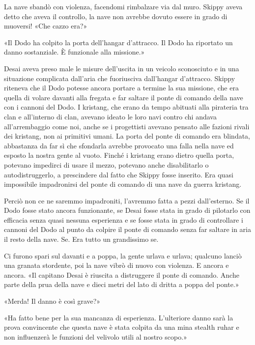 La nave sbandò con violenza, facendomi rimbalzare via dal muro. Skippy
aveva detto che aveva il controllo, la nave non avrebbe dovuto essere in
grado di muoversi! «Che cazzo era?»

«Il Dodo ha colpito la porta dell'hangar d'attracco. Il Dodo ha
riportato un danno sostanziale. È funzionale alla missione.»

Desai aveva preso male le misure dell'uscita in un veicolo sconosciuto e
in una situazione complicata dall'aria che fuoriusciva dall'hangar
d'attracco. Skippy riteneva che il Dodo potesse ancora portare a termine
la sua missione, che era quella di volare davanti alla fregata e far
saltare il ponte di comando della nave con i cannoni del Dodo. I
kristang, che erano da tempo abituati alla pirateria tra clan e
all'interno di clan, avevano ideato le loro navi contro chi andava
all'arrembaggio come noi, anche se i progettisti avevano pensato alle
fazioni rivali dei kristang, non ai primitivi umani. La porta del ponte
di comando era blindata, abbastanza da far sì che sfondarla avrebbe
provocato una falla nella nave ed esposto la nostra gente al vuoto.
Finché i kristang erano dietro quella porta, potevano impedirci di usare
il mezzo, potevano anche disabilitarlo o autodistruggerlo, a prescindere
dal fatto che Skippy fosse inserito. Era quasi impossibile impadronirsi
del ponte di comando di una nave da guerra kristang.

Perciò non ce ne saremmo impadroniti, l'avremmo fatta a pezzi
dall'esterno. Se il Dodo fosse stato ancora funzionante, se Desai fosse
stata in grado di pilotarlo con efficacia senza quasi nessuna esperienza
e se fosse stata in grado di controllare i cannoni del Dodo al punto da
colpire il ponte di comando senza far saltare in aria il resto della
nave. Se. Era tutto un grandissimo se.

Ci furono spari sul davanti e a poppa, la gente urlava e urlava;
qualcuno lanciò una granata stordente, poi la nave vibrò di nuovo con
violenza. E ancora e ancora. «Il capitano Desai è riuscita a distruggere
il ponte di comando. Anche parte della prua della nave e dieci metri del
lato di dritta a poppa del ponte.»

«Merda! Il danno è così grave?»

«Ha fatto bene per la sua mancanza di esperienza. L'ulteriore danno sarà
la prova convincente che questa nave è stata colpita da una mina stealth
ruhar e non influenzerà le funzioni del velivolo utili al nostro scopo.»

